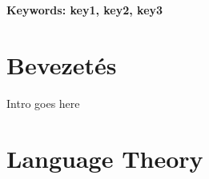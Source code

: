\documentclass[a4paper,oneside,onecolumn,12pt]{LegrandOrangeBook}
\begin{document}
\textbf{Keywords: key1, key2, key3}

\chapter*{Bevezetés}
\begin{eBox}
    Intro goes here
\end{eBox}

\chapter{Language Theory}
\end{document}
